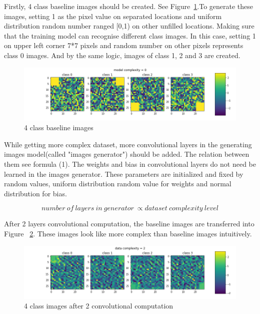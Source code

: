 \documentclass{article}
\begin{document}
Firstly, 4 class baseline images should be created. See Figure~\ref{fig:baseline_image}.To generate these images, setting 1 as the pixel value on separated locations and uniform distribution random number ranged [0,1) on other unfilled locations. Making sure that the training model can recognise different class images. In this case, setting 1 on upper left corner 7*7 pixels and random number on other pixels represents class 0 images. And by the same logic, images of class 1, 2 and 3 are created. 
\begin{figure}[h]
    \centering
    \includegraphics[width=1\linewidth]{demo-0.png}
    \caption{\small 4 class baseline images}
    \label{fig:baseline_image}
\end{figure}

While getting more complex dataset, more convolutional layers in the generating images model(called "images generator") should be added. The relation between them see formula (1). The weights and bias in convolutional layers do not need be learned in the images generator. These parameters are initialized and fixed by random values, uniform distribution random value for weights and normal distribution for bias.

\scriptsize
\begin{equation*}
    number\ of\ layers\ in\ generator\ \propto dataset\ complexity\ level  
\end{equation*}
\normalsize


After 2 layers convolutional computation, the baseline images are transferred into Figure~ \ref{fig:more_complex_image}. These images look like more complex than baseline images intuitively.
\begin{figure}[h]
    \centering
    \includegraphics[width=1\linewidth]{demo-2.png}
    \caption{\small 4 class images after 2 convolutional computation}
    \label{fig:more_complex_image}
\end{figure}
\end{document}
